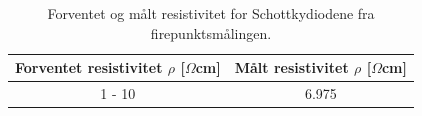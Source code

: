 \documentclass{article}
\begin{document}
    \begin{table}[H]
        \centering
        \caption{Forventet og målt resistivitet for Schottkydiodene fra firepunktsmålingen.}
        \vspace{2mm}
        \label{tab:schottkyresistivitet}
        \begin{tabular}{|c|c|}
            \hline
            Forventet resistivitet $\rho$ [$\Omega$cm] & Målt resistivitet $\rho$ [$\Omega$cm]  \\
            \hline \hline
            1 - 10 & 6.975 \\
            \hline
        \end{tabular} \\
        \hspace{0pt}\\
    \end{table}
    \fi



\end{document}
